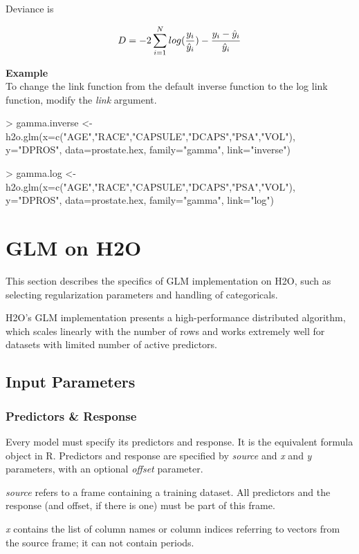 \documentclass[11pt]{article}
\begin{document}
Deviance is 

\[D = -2\sum\limits_{i=1}\limits^{N}{log({y_i \over \hat{y}_i}) - {y_i - \hat{y}_i \over\hat{y}_i }}\]


\textbf{Example}\\
To change the link function from the default inverse function to the log link function, modify the \textit{link} argument.

\begin{spverbatim}
> gamma.inverse <- h2o.glm(x=c("AGE","RACE","CAPSULE","DCAPS","PSA","VOL"), y="DPROS", data=prostate.hex, family="gamma", link="inverse")

> gamma.log <- h2o.glm(x=c("AGE","RACE","CAPSULE","DCAPS","PSA","VOL"), y="DPROS", data=prostate.hex, family="gamma", link="log")
\end{spverbatim}



\section{GLM on H2O}
This section describes the specifics of GLM implementation on H2O, such as selecting regularization parameters and handling of categoricals. 

H2O's GLM implementation presents a high-performance distributed algorithm, which scales linearly with the number of rows and works extremely well for datasets with limited number of active predictors. 

\subsection{Input Parameters}
\subsubsection{Predictors \& Response}
Every model must specify its predictors and response. It is the equivalent formula object in R. Predictors and response are specified by \textit{source} and \textit{x} and \textit{y} parameters, with an optional \textit{offset} parameter. 

\textit{source} refers to a frame containing a training dataset. All predictors and the response (and offset, if there is one) must be part of this frame.

\textit{x} contains the list of column names or column indices referring to vectors from the source frame; it can not contain periods.
\end{document}
